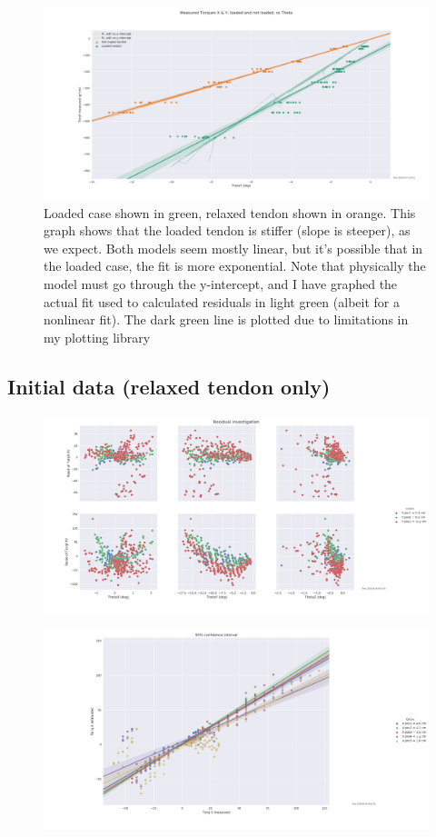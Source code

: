 \documentclass[12pt]{article}
\begin{document}
\begin{figure}[H]
\centering
\includegraphics[width=.9\textwidth]{images/stiff/GOODStiffnessComparison.png}
\caption{Loaded case shown in green, relaxed tendon shown in orange. This graph shows that the
loaded tendon is stiffer (slope is steeper), as we expect. Both models seem mostly linear, but it's
possible that in the loaded case, the fit is more exponential. Note that physically the model must
go through the y-intercept, and I have graphed the actual fit used to calculated residuals in light
green (albeit for a nonlinear fit). The dark green line is plotted due to limitations in my plotting
library}
\end{figure}

\subsection{Initial data (relaxed tendon only)}


\begin{figure}[H]
\centering
\includegraphics[width=.9\textwidth]{images/round1/LinearResid_thetaY.png}
\end{figure}

\begin{figure}[H]
\centering
\includegraphics[width=.9\textwidth]{images/round1/TorqX_hueX.png}
\end{figure}
\end{document}
